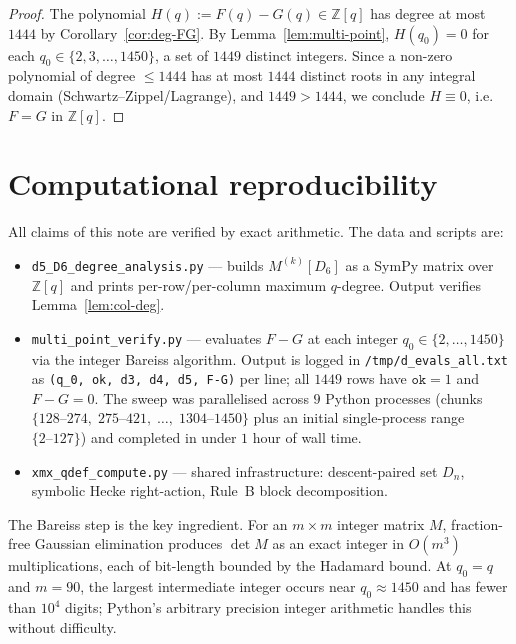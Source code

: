 \documentclass[11pt]{article}
\theoremstyle{definition}
\begin{document}
\begin{proof}
The polynomial $H(q):=F(q)-G(q)\in\mathbb{Z}[q]$ has degree at most $1444$
by Corollary~\ref{cor:deg-FG}. By Lemma~\ref{lem:multi-point}, $H(q_0)=0$ for
each $q_0\in\{2,3,\ldots,1450\}$, a set of $1449$ distinct integers. Since a
non-zero polynomial of degree $\leq 1444$ has at most $1444$ distinct roots in
any integral domain (Schwartz--Zippel/Lagrange), and $1449>1444$, we conclude
$H\equiv 0$, i.e.\ $F=G$ in $\mathbb{Z}[q]$.
\end{proof}

\section{Computational reproducibility}

All claims of this note are verified by exact arithmetic. The data and scripts
are:

\begin{itemize}
\item \texttt{d5\_D6\_degree\_analysis.py} --- builds $M^{(k)}[D_6]$ as a SymPy
matrix over $\mathbb{Z}[q]$ and prints per-row/per-column maximum $q$-degree.
Output verifies Lemma~\ref{lem:col-deg}.

\item \texttt{multi\_point\_verify.py} --- evaluates $F-G$ at each integer
$q_0\in\{2,\ldots,1450\}$ via the integer Bareiss algorithm. Output is logged
in \texttt{/tmp/d\_evals\_all.txt} as
\texttt{(q\_0, ok, d3, d4, d5, F-G)} per line; all $1449$ rows have
$\texttt{ok}=1$ and $F-G=0$. The sweep was parallelised across $9$ Python
processes (chunks $\{128\text{--}274,\;275\text{--}421,\;\ldots,\;1304\text{--}1450\}$
plus an initial single-process range $\{2\text{--}127\}$) and completed in
under $1$ hour of wall time.

\item \texttt{xmx\_qdef\_compute.py} --- shared infrastructure: descent-paired
set $D_n$, symbolic Hecke right-action, Rule~B block decomposition.
\end{itemize}

The Bareiss step is the key ingredient. For an $m\times m$ integer matrix $M$,
fraction-free Gaussian elimination produces $\det M$ as an exact integer
in $O(m^3)$ multiplications, each of bit-length bounded by the Hadamard bound.
At $q_0=q$ and $m=90$, the largest intermediate integer occurs near
$q_0\approx 1450$ and has fewer than $10^4$ digits; Python's arbitrary
precision integer arithmetic handles this without difficulty.
\end{document}
